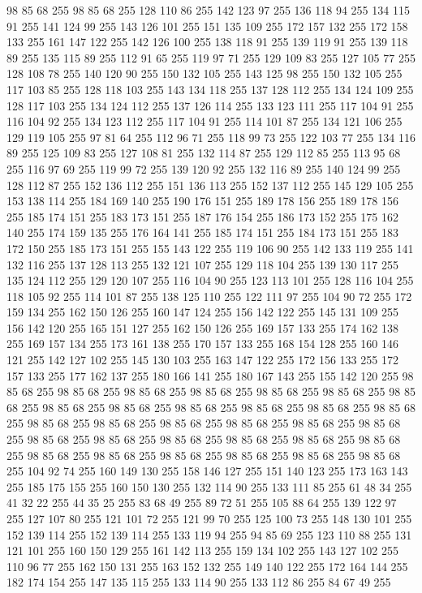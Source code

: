 98 85 68 255 98 85 68 255 128 110 86 255 142 123 97 255 136 118 94 255 134 115 91 255 141 124 99 255 143 126 101 255 151 135 109 255 172 157 132 255 172 158 133 255 161 147 122 255 142 126 100 255 138 118 91 255 139 119 91 255 139 118 89 255 135 115 89 255 112 91 65 255 119 97 71 255 129 109 83 255 127 105 77 255 128 108 78 255 140 120 90 255 150 132 105 255 143 125 98 255 150 132 105 255 117 103 85 255 128 118 103 255 143 134 118 255 137 128 112 255 134 124 109 255 128 117 103 255 134 124 112 255 137 126 114 255 133 123 111 255 117 104 91 255 116 104 92 255 134 123 112 255 117 104 91 255 114 101 87 255 134 121 106 255 129 119 105 255 97 81 64 255 112 96 71 255 118 99 73 255 122 103 77 255 134 116 89 255 125 109 83 255 127 108 81 255 132 114 87 255 129 112 85 255 113 95 68 255 116 97 69 255 119 99 72 255 139 120 92 255 132 116 89 255 140 124 99 255 128 112 87 255 152 136 112 255 151 136 113 255 152 137 112 255 145 129 105 255 153 138 114 255 184 169 140 255
190 176 151 255 189 178 156 255 189 178 156 255 185 174 151 255 183 173 151 255 187 176 154 255 186 173 152 255 175 162 140 255 174 159 135 255 176 164 141 255 185 174 151 255 184 173 151 255 183 172 150 255 185 173 151 255 155 143 122 255 119 106 90 255 142 133 119 255 141 132 116 255 137 128 113 255 132 121 107 255 129 118 104 255 139 130 117 255 135 124 112 255 129 120 107 255 116 104 90 255 123 113 101 255 128 116 104 255 118 105 92 255 114 101 87 255 138 125 110 255 122 111 97 255 104 90 72 255 172 159 134 255 162 150 126 255 160 147 124 255 156 142 122 255 145 131 109 255 156 142 120 255 165 151 127 255 162 150 126 255 169 157 133 255 174 162 138 255 169 157 134 255 173 161 138 255 170 157 133 255 168 154 128 255 160 146 121 255 142 127 102 255 145 130 103 255 163 147 122 255 172 156 133 255 172 157 133 255 177 162 137 255 180 166 141 255 180 167 143 255 155 142 120 255 98 85 68 255 98 85 68 255 98 85 68 255 98 85 68 255 98 85 68 255 98 85 68 255 98 85 68 255 98 85 68 255
98 85 68 255 98 85 68 255 98 85 68 255 98 85 68 255 98 85 68 255 98 85 68 255 98 85 68 255 98 85 68 255 98 85 68 255 98 85 68 255 98 85 68 255 98 85 68 255 98 85 68 255 98 85 68 255 98 85 68 255 98 85 68 255 98 85 68 255 98 85 68 255 98 85 68 255 98 85 68 255 98 85 68 255 98 85 68 255 98 85 68 255 104 92 74 255 160 149 130 255 158 146 127 255 151 140 123 255 173 163 143 255 185 175 155 255 160 150 130 255 132 114 90 255 133 111 85 255 61 48 34 255 41 32 22 255 44 35 25 255 83 68 49 255 89 72 51 255 105 88 64 255 139 122 97 255 127 107 80 255 121 101 72 255 121 99 70 255 125 100 73 255 148 130 101 255 152 139 114 255 152 139 114 255 133 119 94 255 94 85 69 255 123 110 88 255 131 121 101 255 160 150 129 255 161 142 113 255 159 134 102 255 143 127 102 255 110 96 77 255 162 150 131 255 163 152 132 255 149 140 122 255 172 164 144 255 182 174 154 255 147 135 115 255 133 114 90 255 133 112 86 255 84 67 49 255
